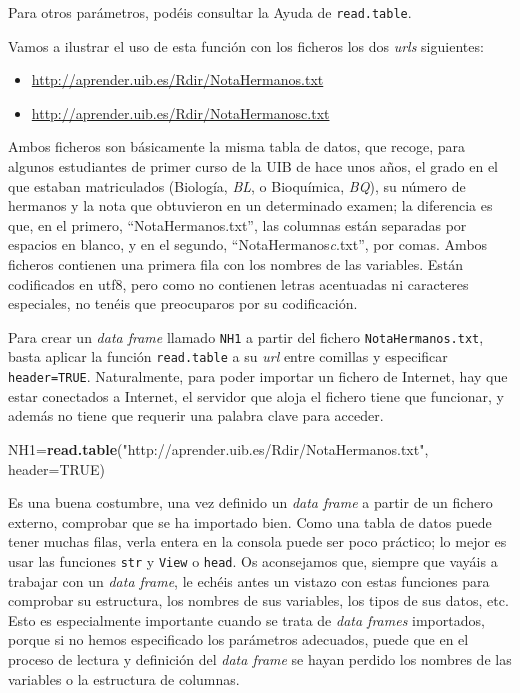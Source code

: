 \documentclass[]{book}
\newenvironment{Shaded}{\begin{snugshade}}{\end{snugshade}}
\newcommand{\DataTypeTok}[1]{\textcolor[rgb]{0.13,0.29,0.53}{#1}}
\newcommand{\KeywordTok}[1]{\textcolor[rgb]{0.13,0.29,0.53}{\textbf{#1}}}
\newcommand{\NormalTok}[1]{#1}
\newcommand{\OtherTok}[1]{\textcolor[rgb]{0.56,0.35,0.01}{#1}}
\newcommand{\StringTok}[1]{\textcolor[rgb]{0.31,0.60,0.02}{#1}}
\providecommand{\tightlist}{%
  \setlength{\itemsep}{0pt}\setlength{\parskip}{0pt}}
\theoremstyle{definition}
\theoremstyle{definition}
\theoremstyle{definition}
\theoremstyle{remark}
\begin{document}
Para otros parámetros, podéis consultar la Ayuda de \texttt{read.table}.

Vamos a ilustrar el uso de esta función con los ficheros los dos \emph{urls} siguientes:

\begin{itemize}
\tightlist
\item
  \url{http://aprender.uib.es/Rdir/NotaHermanos.txt}
\item
  \url{http://aprender.uib.es/Rdir/NotaHermanosc.txt}
\end{itemize}

Ambos ficheros son básicamente la misma tabla de datos, que recoge, para algunos estudiantes de primer curso de la UIB de hace unos años, el grado en el que estaban matriculados (Biología, \emph{BL}, o Bioquímica, \emph{BQ}), su número de hermanos y la nota que obtuvieron en un determinado examen; la diferencia es que, en el primero, ``NotaHermanos.txt'', las columnas están separadas por espacios en blanco, y en el segundo, ``NotaHermanos\emph{c}.txt'', por comas. Ambos ficheros contienen una primera fila con los nombres de las variables. Están codificados en utf8, pero como no contienen letras acentuadas ni caracteres especiales, no tenéis que preocuparos por su codificación.

Para crear un \emph{data frame} llamado \texttt{NH1} a partir del fichero \texttt{NotaHermanos.txt}, basta aplicar la función \texttt{read.table} a su \emph{url} entre comillas y especificar \texttt{header=TRUE}. Naturalmente, para poder importar un fichero de Internet, hay que estar conectados a Internet, el servidor que aloja el fichero tiene que funcionar, y además no tiene que requerir una palabra clave para acceder.

\begin{Shaded}
\begin{Highlighting}[]
\NormalTok{NH1=}\KeywordTok{read.table}\NormalTok{(}\StringTok{"http://aprender.uib.es/Rdir/NotaHermanos.txt"}\NormalTok{, }\DataTypeTok{header=}\OtherTok{TRUE}\NormalTok{)}
\end{Highlighting}
\end{Shaded}

Es una buena costumbre, una vez definido un \emph{data frame} a partir de un fichero externo, comprobar que se ha importado bien. Como una tabla de datos puede tener muchas filas, verla entera en la consola puede ser poco práctico; lo mejor es usar las funciones \texttt{str} y \texttt{View} o \texttt{head}. Os aconsejamos que, siempre que vayáis a trabajar con un \emph{data frame}, le echéis antes un vistazo con estas funciones para comprobar su estructura, los nombres de sus variables, los tipos de sus datos, etc. Esto es especialmente importante cuando se trata de \emph{data frames} importados, porque si no hemos especificado los parámetros adecuados, puede que en el proceso de lectura y definición del \emph{data frame} se hayan perdido los nombres de las variables o la estructura de columnas.
\end{document}

